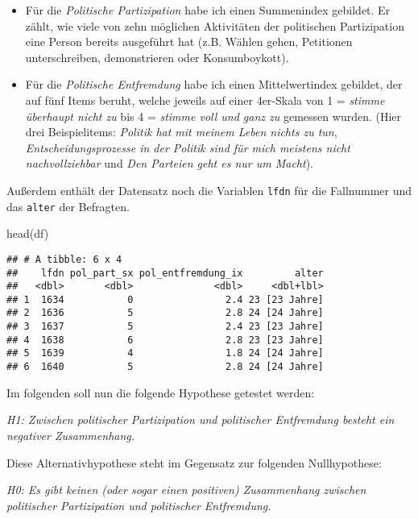 \documentclass[
]{book}
\newenvironment{Shaded}{\begin{snugshade}}{\end{snugshade}}
\newcommand{\FunctionTok}[1]{\textcolor[rgb]{0.00,0.00,0.00}{#1}}
\newcommand{\NormalTok}[1]{#1}
\begin{document}
\begin{itemize}
\item
  Für die \emph{Politische Partizipation} habe ich einen Summenindex gebildet. Er zählt, wie viele von zehn möglichen Aktivitäten der politischen Partizipation eine Person bereits ausgeführt hat (z.B. Wählen gehen, Petitionen unterschreiben, demonstrieren oder Konsumboykott).
\item
  Für die \emph{Politische Entfremdung} habe ich einen Mittelwertindex gebildet, der auf fünf Items beruht, welche jeweils auf einer 4er-Skala von 1 = \emph{stimme überhaupt nicht zu} bis 4 = \emph{stimme voll und ganz zu} gemessen wurden. (Hier drei Beispielitems: \emph{Politik hat mit meinem Leben nichts zu tun}, \emph{Entscheidungsprozesse in der Politik sind für mich meistens nicht nachvollziehbar} und \emph{Den Parteien geht es nur um Macht}).
\end{itemize}

Außerdem enthält der Datensatz noch die Variablen \texttt{lfdn} für die Fallnummer und das \texttt{alter} der Befragten.

\begin{Shaded}
\begin{Highlighting}[]
\FunctionTok{head}\NormalTok{(df)}
\end{Highlighting}
\end{Shaded}

\begin{verbatim}
## # A tibble: 6 x 4
##    lfdn pol_part_sx pol_entfremdung_ix         alter
##   <dbl>       <dbl>              <dbl>     <dbl+lbl>
## 1  1634           0                2.4 23 [23 Jahre]
## 2  1636           5                2.8 24 [24 Jahre]
## 3  1637           5                2.4 23 [23 Jahre]
## 4  1638           6                2.8 23 [23 Jahre]
## 5  1639           4                1.8 24 [24 Jahre]
## 6  1640           5                2.8 24 [24 Jahre]
\end{verbatim}

Im folgenden soll nun die folgende Hypothese getestet werden:

\emph{H1: Zwischen politischer Partizipation und politischer Entfremdung besteht ein negativer Zusammenhang.}

Diese Alternativhypothese steht im Gegensatz zur folgenden Nullhypothese:

\emph{H0: Es gibt keinen (oder sogar einen positiven) Zusammenhang zwischen politischer Partizipation und politischer Entfremdung.}
\end{document}
